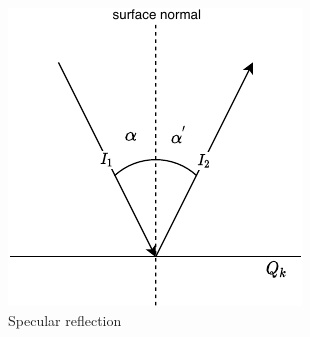 \begin{figure}[H]
    \begin{center}
    \includegraphics[width=\textwidth/2]{figures/approach/figSpecularReflection.pdf}
    \end{center}
    \caption[Specular reflection]{Specular reflection}
    \label{fig:specularReflection}
\end{figure}
